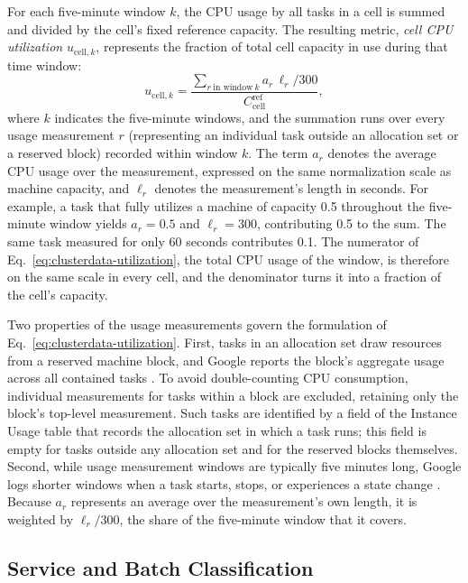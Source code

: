 \documentclass{UNCC-thesis}
\begin{document}
For each five-minute window \(k\), the CPU usage by all tasks in a cell is
summed and divided by the cell's fixed reference capacity. The resulting
metric, \emph{cell CPU utilization} \(u_{\mathrm{cell},k}\), represents the
fraction of total cell capacity in use during that time window:
\begin{equation}
  u_{\mathrm{cell},k}
  =
  \frac{\displaystyle\sum_{r\ \text{in window}\ k} a_r\,\ell_r/300}
         {C^{\mathrm{ref}}_{\mathrm{cell}}} ,
  \label{eq:clusterdata-utilization}
\end{equation}
where \(k\) indicates the five-minute windows, and the summation runs over every
usage measurement \(r\) (representing an individual task outside an allocation set
or a reserved block) recorded within window \(k\).
The term \(a_r\) denotes the average CPU usage over the measurement, expressed on the
same normalization scale as machine capacity, and \(\ell_r\) denotes the measurement's
length in seconds. For example, a task that fully utilizes a machine of capacity 0.5
throughout the five-minute window yields \(a_r=0.5\) and \(\ell_r=300\), contributing
0.5 to the sum. The same task measured for only 60 seconds contributes 0.1.
The numerator of Eq.~\eqref{eq:clusterdata-utilization}, the total CPU usage of
the window, is therefore on the same scale in every cell, and the denominator turns
it into a fraction of the cell's capacity.

Two properties of the usage measurements govern the formulation of
Eq.~\eqref{eq:clusterdata-utilization}. First, tasks in an
allocation set draw resources from a reserved machine block, and Google reports
the block's aggregate usage across all contained tasks
\cite{wilkes2020clusterdata2019}. To avoid double-counting CPU consumption,
individual measurements for tasks within a block are excluded, retaining only
the block's top-level measurement. Such tasks are identified by a field of the Instance Usage
table that records the allocation set in which a task runs; this field is empty for tasks
outside any allocation set and for the reserved blocks themselves.
Second, while usage measurement windows are typically
five minutes long, Google logs shorter windows when a
task starts, stops, or experiences a state change
\cite{wilkes2020clusterdata2019, googleTraceFormatV3}. Because \(a_r\) represents an average
over the measurement's own length, it is weighted by \(\ell_r/300\), the share of the
five-minute window that it covers.

\subsection{Service and Batch Classification}
\label{subsec:clusterdata-tier-split}
\end{document}

